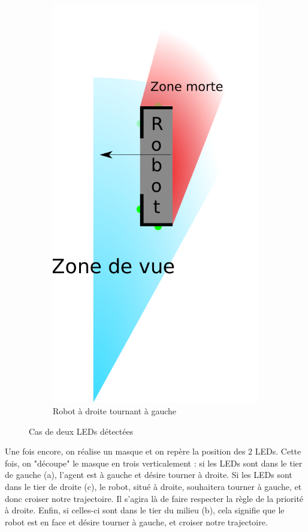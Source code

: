 \begin{itemize}
\begin{figure}[H]
\begin{subfigure}[h]{0.2\textwidth}
					        \includegraphics[width=\textwidth]{Graphics/casClignotants_GG.pdf}
					        \caption{Robot à droite tournant à gauche}
					    \end{subfigure}
					    \caption{Cas de deux LEDs détectées}
					\end{figure}

					Une fois encore, on réalise un masque et on repère la position des 2 LEDs. Cette fois, on "découpe" le masque en trois verticalement : si les LEDs sont dans le tier de gauche (a), l'agent est à gauche et désire tourner à droite. Si les LEDs sont dans le tier de droite (c), le robot, situé à droite, souhaitera tourner à gauche, et donc croiser notre trajectoire. Il s'agira là de faire respecter la règle de la priorité à droite. Enfin, si celles-ci sont dans le tier du milieu (b), cela signifie que le robot est en face et désire tourner à gauche, et croiser notre trajectoire.
			\end{itemize}